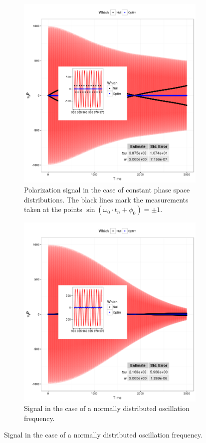 \documentclass{article}
\begin{document}
\begin{figure}[h]
	\begin{subfigure}{\textwidth}
		\centering
		\includegraphics[scale=.6]{img/Signal/PHYS_Sgl_plot}
		\caption{Polarization signal in the case of constant phase space distributions. The black lines mark the measurements taken at the points $\sin(\omega_0\cdot t_n + \phi_0)=\pm 1$.\label{fig:Sgl_cDyPhys}}
	\end{subfigure}
	\begin{subfigure}{\textwidth}
		\centering
		\includegraphics[scale=.6]{img/Signal/NORM_Sgl_plot}
		\caption{Signal in the case of a normally distributed oscillation frequency.\label{fig:Sgl_cDyNorm}}
	\end{subfigure}
\end{figure}
\end{document}
